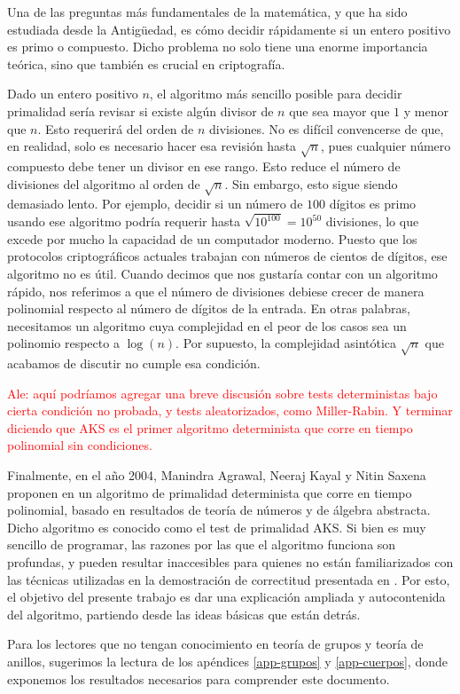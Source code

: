 Una de las preguntas más fundamentales de la matemática, y que ha sido estudiada desde la Antigüedad, es cómo decidir rápidamente si un entero positivo es primo o compuesto. Dicho problema no solo tiene una enorme importancia teórica, sino que también es crucial en criptografía.

Dado un entero positivo $n$, el algoritmo más sencillo posible para decidir primalidad sería revisar si existe algún divisor de $n$ que sea mayor que $1$ y menor que $n$. Esto requerirá del orden de $n$ divisiones. No es difícil convencerse de que, en realidad, solo es necesario hacer esa revisión hasta $\sqrt{n}$, pues cualquier número compuesto debe tener un divisor en ese rango. Esto reduce el número de divisiones del algoritmo al orden de $\sqrt{n}$. Sin embargo, esto sigue siendo demasiado lento. Por ejemplo, decidir si un número de $100$ dígitos es primo usando ese algoritmo podría requerir hasta $\sqrt{10^{100}} = 10^{50}$ divisiones, lo que excede por mucho la capacidad de un computador moderno. Puesto que los protocolos criptográficos actuales trabajan con números de cientos de dígitos, ese algoritmo no es útil. Cuando decimos que nos gustaría contar con un algoritmo rápido, nos referimos a que el número de divisiones debiese crecer de manera polinomial respecto al número de dígitos de la entrada. En otras palabras, necesitamos un algoritmo cuya complejidad en el peor de los casos sea un polinomio respecto a $\log(n)$. Por supuesto, la complejidad asintótica $\sqrt{n}$ que acabamos de discutir no cumple esa condición.


\textcolor{red}{Ale: aquí podríamos agregar una breve discusión sobre tests deterministas bajo cierta condición no probada, y tests aleatorizados, como Miller-Rabin. Y terminar diciendo que AKS es el primer algoritmo determinista que corre en tiempo polinomial sin condiciones.}


Finalmente, en el año 2004, Manindra Agrawal, Neeraj Kayal y Nitin Saxena proponen en \cite{AKS04} un algoritmo de primalidad determinista que corre en tiempo polinomial, basado en resultados de teorí­a de números y de álgebra abstracta. Dicho algoritmo es conocido como el test de primalidad AKS. Si bien es muy sencillo de programar, las razones por las que el algoritmo funciona son profundas, y pueden resultar inaccesibles para quienes no están familiarizados con las técnicas utilizadas en la demostración de correctitud presentada en \cite{AKS04}. Por esto, el objetivo del presente trabajo es dar una explicación ampliada y autocontenida del algoritmo, partiendo desde las ideas básicas que están detrás.

Para los lectores que no tengan conocimiento en teoría de grupos y teoría de anillos, sugerimos la lectura de los apéndices \ref{app-grupos} y \ref{app-cuerpos}, donde exponemos los resultados necesarios para comprender este documento.